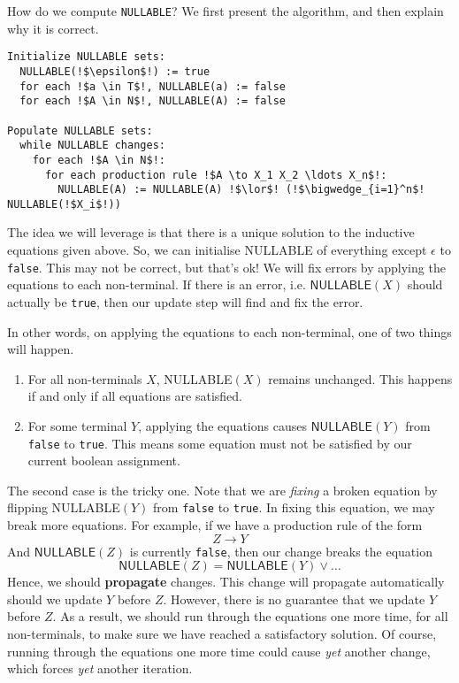 How do we compute \texttt{NULLABLE}? We first present the algorithm, and then explain why it is correct.

\begin{lstlisting}[style=pseudocode]
Initialize NULLABLE sets:
  NULLABLE(!$\epsilon$!) := true
  for each !$a \in T$!, NULLABLE(a) := false 
  for each !$A \in N$!, NULLABLE(A) := false

Populate NULLABLE sets:
  while NULLABLE changes: 
    for each !$A \in N$!:
      for each production rule !$A \to X_1 X_2 \ldots X_n$!:
        NULLABLE(A) := NULLABLE(A) !$\lor$! (!$\bigwedge_{i=1}^n$! NULLABLE(!$X_i$!))
\end{lstlisting}

The idea we will leverage is that there is a unique solution to the inductive equations given above. So, we can initialise \textsf{NULLABLE} of everything except $\epsilon$ to \texttt{false}. This may not be correct, but that's ok! We will fix errors by applying the equations to each non-terminal. If there is an error, i.e. $\textsf{NULLABLE}(X)$ should actually be \texttt{true}, then our update step will find and fix the error.

In other words, on applying the equations to each non-terminal, one of two things will happen. 

\begin{enumerate}
    \item For all non-terminals $X$, \textsf{NULLABLE}$(X)$ remains unchanged. This happens if and only if all equations are satisfied.
    \item For some terminal $Y$, applying the equations causes $\textsf{NULLABLE}(Y)$ from \texttt{false} to \texttt{true}. This means some equation must not be satisfied by our current boolean assignment.
\end{enumerate}

The second case is the tricky one. Note that we are \textit{fixing} a broken equation by flipping \textsf{NULLABLE}$(Y)$ from \texttt{false} to \texttt{true}. In fixing this equation, we may break more equations. For example, if we have a production rule of the form
\[ Z \to Y \]
And $\textsf{NULLABLE}(Z)$ is currently \texttt{false}, then our change breaks the equation 
\[ \textsf{NULLABLE}(Z) = \textsf{NULLABLE}(Y) \lor \ldots \] 
Hence, we should \textbf{propagate} changes. This change will propagate automatically should we update $Y$ before $Z$. However, there is no guarantee that we update $Y$ before $Z$. As a result, we should run through the equations one more time, for all non-terminals, to make sure we have reached a satisfactory solution. Of course, running through the equations one more time could cause \textit{yet} another change, which forces \textit{yet} another iteration.

